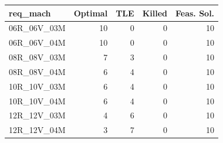 
\begin{tabular}{lrrrr}
\toprule
req\_mach & Optimal & TLE & Killed & Feas. Sol.\\
\midrule
06R\_06V\_03M & 10 & 0 & 0 & 10\\
06R\_06V\_04M & 10 & 0 & 0 & 10\\
08R\_08V\_03M & 7 & 3 & 0 & 10\\
08R\_08V\_04M & 6 & 4 & 0 & 10\\
10R\_10V\_03M & 6 & 4 & 0 & 10\\
\addlinespace
10R\_10V\_04M & 6 & 4 & 0 & 10\\
12R\_12V\_03M & 4 & 6 & 0 & 10\\
12R\_12V\_04M & 3 & 7 & 0 & 10\\
\bottomrule
\end{tabular}
